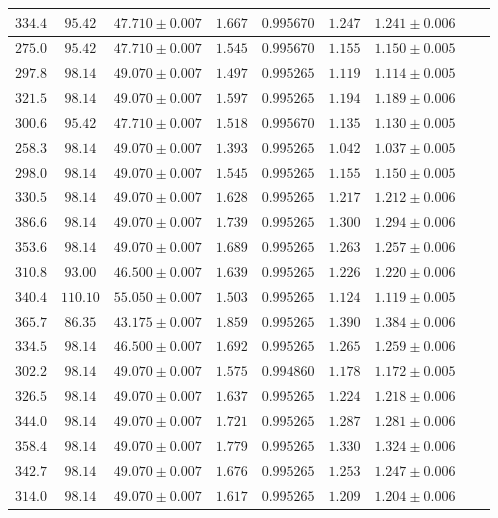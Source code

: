 \documentclass[]{article}
\begin{document}
\begin{table}[H]
\begin{tabular}{||c|c|c|c|c|c|c|c|c||}
    $334.4$ & $95.42$ & $47.710 \pm 0.007$ & $1.667$ & $0.995670$ & $1.247$ & $1.241 \pm 0.006$ \\\hline
    $275.0$ & $95.42$ & $47.710 \pm 0.007$ & $1.545$ & $0.995670$ & $1.155$ & $1.150 \pm 0.005$ \\\hline
    $297.8$ & $98.14$ & $49.070 \pm 0.007$ & $1.497$ & $0.995265$ & $1.119$ & $1.114 \pm 0.005$ \\\hline
    $321.5$ & $98.14$ & $49.070 \pm 0.007$ & $1.597$ & $0.995265$ & $1.194$ & $1.189 \pm 0.006$ \\\hline
    $300.6$ & $95.42$ & $47.710 \pm 0.007$ & $1.518$ & $0.995670$ & $1.135$ & $1.130 \pm 0.005$ \\\hline
    $258.3$ & $98.14$ & $49.070 \pm 0.007$ & $1.393$ & $0.995265$ & $1.042$ & $1.037 \pm 0.005$ \\\hline
    $298.0$ & $98.14$ & $49.070 \pm 0.007$ & $1.545$ & $0.995265$ & $1.155$ & $1.150 \pm 0.005$ \\\hline
    $330.5$ & $98.14$ & $49.070 \pm 0.007$ & $1.628$ & $0.995265$ & $1.217$ & $1.212 \pm 0.006$ \\\hline
    $386.6$ & $98.14$ & $49.070 \pm 0.007$ & $1.739$ & $0.995265$ & $1.300$ & $1.294 \pm 0.006$ \\\hline
    $353.6$ & $98.14$ & $49.070 \pm 0.007$ & $1.689$ & $0.995265$ & $1.263$ & $1.257 \pm 0.006$ \\\hline
    $310.8$ & $93.00$ & $46.500 \pm 0.007$ & $1.639$ & $0.995265$ & $1.226$ & $1.220 \pm 0.006$ \\\hline
    $340.4$ &$110.10$ & $55.050 \pm 0.007$ & $1.503$ & $0.995265$ & $1.124$ & $1.119 \pm 0.005$ \\\hline
    $365.7$ & $86.35$ & $43.175 \pm 0.007$ & $1.859$ & $0.995265$ & $1.390$ & $1.384 \pm 0.006$ \\\hline
    $334.5$ & $98.14$ & $46.500 \pm 0.007$ & $1.692$ & $0.995265$ & $1.265$ & $1.259 \pm 0.006$ \\\hline
    $302.2$ & $98.14$ & $49.070 \pm 0.007$ & $1.575$ & $0.994860$ & $1.178$ & $1.172 \pm 0.005$ \\\hline
    $326.5$ & $98.14$ & $49.070 \pm 0.007$ & $1.637$ & $0.995265$ & $1.224$ & $1.218 \pm 0.006$ \\\hline
    $344.0$ & $98.14$ & $49.070 \pm 0.007$ & $1.721$ & $0.995265$ & $1.287$ & $1.281 \pm 0.006$ \\\hline
    $358.4$ & $98.14$ & $49.070 \pm 0.007$ & $1.779$ & $0.995265$ & $1.330$ & $1.324 \pm 0.006$ \\\hline
    $342.7$ & $98.14$ & $49.070 \pm 0.007$ & $1.676$ & $0.995265$ & $1.253$ & $1.247 \pm 0.006$ \\\hline
    $314.0$ & $98.14$ & $49.070 \pm 0.007$ & $1.617$ & $0.995265$ & $1.209$ & $1.204 \pm 0.006$ \\\hline
    

\end{tabular}
\end{table}
\end{document}
